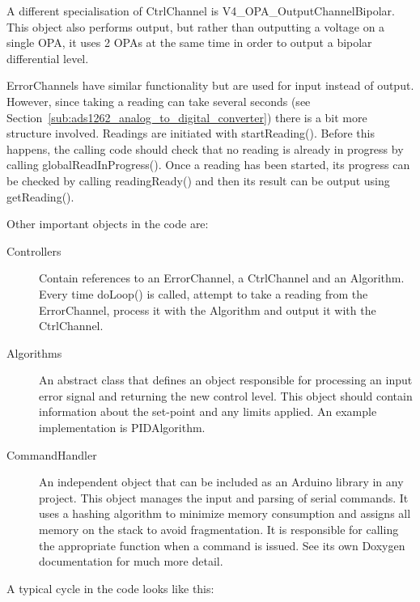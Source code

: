 \documentclass[11pt]{report}
\begin{document}
A different specialisation of CtrlChannel is V4\_OPA\_OutputChannelBipolar. This object also performs output, but rather than outputting a voltage on a single OPA, it uses 2 OPAs at the same time in order to output a bipolar differential level. 

ErrorChannels have similar functionality but are used for input instead of output. However, since taking a reading can take several seconds (see Section~\ref{sub:ads1262_analog_to_digital_converter}) there is a bit more structure involved. Readings are initiated with startReading(). Before this happens, the calling code should check that no reading is already in progress by calling globalReadInProgress(). Once a reading has been started, its progress can be checked by calling readingReady() and then its result can be output using getReading(). 

Other important objects in the code are:

\begin{description}
	\item[Controllers]  Contain references to an ErrorChannel, a CtrlChannel and an Algorithm. Every time doLoop() is called, attempt to take a reading from the ErrorChannel, process it with the Algorithm and output it with the CtrlChannel. 

	\item[Algorithms] An abstract class that defines an object responsible for processing an input error signal and returning the new control level. This object should contain information about the set-point and any limits applied. An example implementation is PIDAlgorithm. 

	\item[CommandHandler] An independent object that can be included as an Arduino library in any project. This object manages the input and parsing of serial commands. It uses a hashing algorithm to minimize memory consumption and assigns all memory on the stack to avoid fragmentation. It is responsible for calling the appropriate function when a command is issued. See its own Doxygen documentation for much more detail. 
\end{description}

A typical cycle in the code looks like this:
\end{document}
